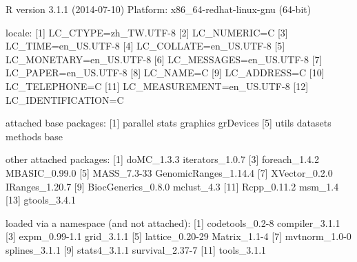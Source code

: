 \documentclass[a4paper,10pt]{article}
\begin{document}
\begin{Schunk}
\begin{Soutput}
R version 3.1.1 (2014-07-10)
Platform: x86_64-redhat-linux-gnu (64-bit)

locale:
 [1] LC_CTYPE=zh_TW.UTF-8      
 [2] LC_NUMERIC=C              
 [3] LC_TIME=en_US.UTF-8       
 [4] LC_COLLATE=en_US.UTF-8    
 [5] LC_MONETARY=en_US.UTF-8   
 [6] LC_MESSAGES=en_US.UTF-8   
 [7] LC_PAPER=en_US.UTF-8      
 [8] LC_NAME=C                 
 [9] LC_ADDRESS=C              
[10] LC_TELEPHONE=C            
[11] LC_MEASUREMENT=en_US.UTF-8
[12] LC_IDENTIFICATION=C       

attached base packages:
[1] parallel  stats     graphics  grDevices
[5] utils     datasets  methods   base     

other attached packages:
 [1] doMC_1.3.3           iterators_1.0.7     
 [3] foreach_1.4.2        MBASIC_0.99.0       
 [5] MASS_7.3-33          GenomicRanges_1.14.4
 [7] XVector_0.2.0        IRanges_1.20.7      
 [9] BiocGenerics_0.8.0   mclust_4.3          
[11] Rcpp_0.11.2          msm_1.4             
[13] gtools_3.4.1        

loaded via a namespace (and not attached):
 [1] codetools_0.2-8 compiler_3.1.1 
 [3] expm_0.99-1.1   grid_3.1.1     
 [5] lattice_0.20-29 Matrix_1.1-4   
 [7] mvtnorm_1.0-0   splines_3.1.1  
 [9] stats4_3.1.1    survival_2.37-7
[11] tools_3.1.1    
\end{Soutput}
\end{Schunk}



%


\end{document}
